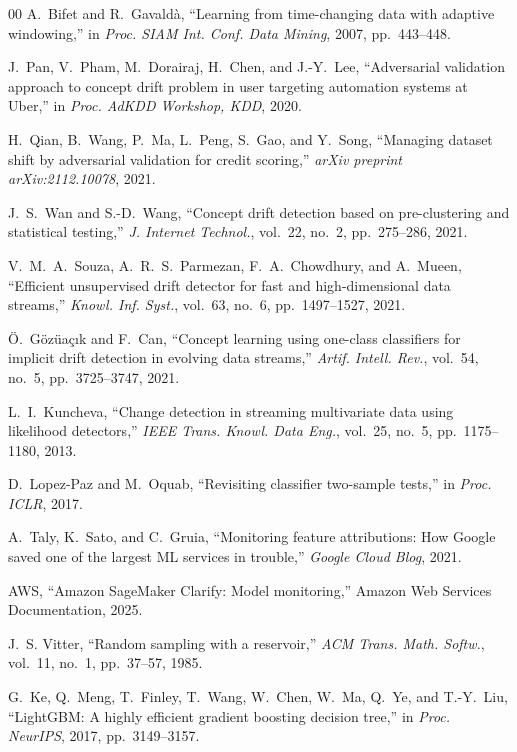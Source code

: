 \documentclass[conference,a4paper]{IEEEtran}
\begin{document}
{\begin{thebibliography}{00}
 A.~Bifet and R.~Gavald\`{a}, ``Learning from time-changing data with adaptive windowing,'' in \textit{Proc. SIAM Int. Conf. Data Mining}, 2007, pp.~443--448.

 J.~Pan, V.~Pham, M.~Dorairaj, H.~Chen, and J.-Y.~Lee, ``Adversarial validation approach to concept drift problem in user targeting automation systems at Uber,'' in \textit{Proc. AdKDD Workshop, KDD}, 2020.

 H.~Qian, B.~Wang, P.~Ma, L.~Peng, S.~Gao, and Y.~Song, ``Managing dataset shift by adversarial validation for credit scoring,'' \textit{arXiv preprint arXiv:2112.10078}, 2021.

 J.~S.~Wan and S.-D.~Wang, ``Concept drift detection based on pre-clustering and statistical testing,'' \textit{J. Internet Technol.}, vol.~22, no.~2, pp.~275--286, 2021.

 V.~M.~A.~Souza, A.~R.~S.~Parmezan, F.~A.~Chowdhury, and A.~Mueen, ``Efficient unsupervised drift detector for fast and high-dimensional data streams,'' \textit{Knowl. Inf. Syst.}, vol.~63, no.~6, pp.~1497--1527, 2021.

 \"{O}.~G\"{o}z\"{u}a\c{c}{\i}k and F.~Can, ``Concept learning using one-class classifiers for implicit drift detection in evolving data streams,'' \textit{Artif. Intell. Rev.}, vol.~54, no.~5, pp.~3725--3747, 2021.

 L.~I.~Kuncheva, ``Change detection in streaming multivariate data using likelihood detectors,'' \textit{IEEE Trans. Knowl. Data Eng.}, vol.~25, no.~5, pp.~1175--1180, 2013.

 D.~Lopez-Paz and M.~Oquab, ``Revisiting classifier two-sample tests,'' in \textit{Proc. ICLR}, 2017.

 A.~Taly, K.~Sato, and C.~Gruia, ``Monitoring feature attributions: How Google saved one of the largest ML services in trouble,'' \textit{Google Cloud Blog}, 2021.

 AWS, ``Amazon SageMaker Clarify: Model monitoring,'' Amazon Web Services Documentation, 2025.

 J.~S. Vitter, ``Random sampling with a reservoir,'' \textit{ACM Trans. Math. Softw.}, vol.~11, no.~1, pp.~37--57, 1985.

 G.~Ke, Q.~Meng, T.~Finley, T.~Wang, W.~Chen, W.~Ma, Q.~Ye, and T.-Y.~Liu, ``LightGBM: A highly efficient gradient boosting decision tree,'' in \textit{Proc. NeurIPS}, 2017, pp.~3149--3157.


\end{thebibliography}}
\end{document}
